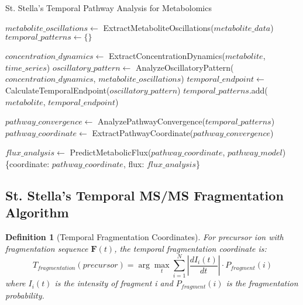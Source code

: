 \documentclass[12pt,a4paper]{article}
\newtheorem{definition}{Definition}
\begin{document}
\begin{algorithm}
\caption{St. Stella's Temporal Pathway Analysis for Metabolomics}
\begin{algorithmic}
    \State $metabolite\_oscillations \gets$ ExtractMetaboliteOscillations($metabolite\_data$)
    \State $temporal\_patterns \gets \{\}$
    
        \State $concentration\_dynamics \gets$ ExtractConcentrationDynamics($metabolite$, $time\_series$)
        \State $oscillatory\_pattern \gets$ AnalyzeOscillatoryPattern($concentration\_dynamics$, $metabolite\_oscillations$)
        \State $temporal\_endpoint \gets$ CalculateTemporalEndpoint($oscillatory\_pattern$)
        \State $temporal\_patterns$.add($metabolite$, $temporal\_endpoint$)
    \EndFor
    
    \State $pathway\_convergence \gets$ AnalyzePathwayConvergence($temporal\_patterns$)
    \State $pathway\_coordinate \gets$ ExtractPathwayCoordinate($pathway\_convergence$)
    
    \State $flux\_analysis \gets$ PredictMetabolicFlux($pathway\_coordinate$, $pathway\_model$)
    \State \Return \{coordinate: $pathway\_coordinate$, flux: $flux\_analysis$\}
\EndProcedure
\end{algorithmic}
\end{algorithm}

\subsection{St. Stella's Temporal MS/MS Fragmentation Algorithm}

\begin{definition}[Temporal Fragmentation Coordinates]
For precursor ion with fragmentation sequence $\mathbf{F}(t)$, the temporal fragmentation coordinate is:
\begin{equation}
T_{fragmentation}(precursor) = \arg\max_{t} \sum_{i=1}^{N} \left| \frac{dI_i(t)}{dt} \right| \cdot P_{fragment}(i)
\end{equation}
where $I_i(t)$ is the intensity of fragment i and $P_{fragment}(i)$ is the fragmentation probability.
\end{definition}
\end{document}
